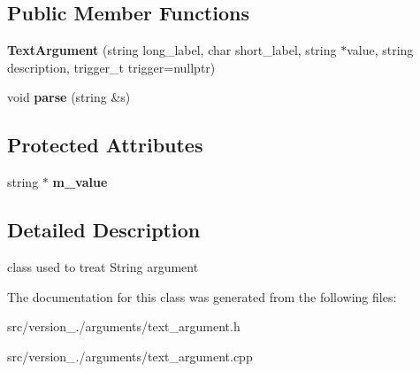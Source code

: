 \subsection*{Public Member Functions}
\begin{DoxyCompactItemize}
\item 
\mbox{\label{classez_1_1arguments_1_1TextArgument_a3fae405c9a54801161675aea2668450c}} 
{\bfseries Text\+Argument} (string long\+\_\+label, char short\+\_\+label, string $\ast$value, string description, trigger\+\_\+t trigger=nullptr)
\item 
\mbox{\label{classez_1_1arguments_1_1TextArgument_a2370de26a8b11e3aee91ec8e230ebbd8}} 
void {\bfseries parse} (string \&s)
\end{DoxyCompactItemize}
\subsection*{Protected Attributes}
\begin{DoxyCompactItemize}
\item 
\mbox{\label{classez_1_1arguments_1_1TextArgument_a39a15441b03ed33e698c654cfedcad22}} 
string $\ast$ {\bfseries m\+\_\+value}
\end{DoxyCompactItemize}


\subsection{Detailed Description}
class used to treat String argument 

The documentation for this class was generated from the following files\+:\begin{DoxyCompactItemize}
\item 
src/version\+\_./arguments/text\+\_\+argument.\+h\item 
src/version\+\_./arguments/text\+\_\+argument.\+cpp\end{DoxyCompactItemize}
